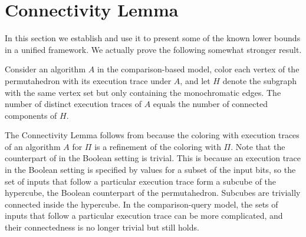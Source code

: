 \section{Connectivity Lemma}
\label{sec:connectivity}

In this section we establish  and use it to present some of the known lower bounds in a unified framework. We actually prove the following somewhat stronger result.

\begin{lemma}\label{lemma:connectivity:strong}
Consider an algorithm $A$ in the comparison-based model, color each vertex of the permutahedron with its execution trace under $A$, and let $H$ denote the subgraph with the same vertex set but only containing the monochromatic edges. The number of distinct execution traces of $A$ equals the number of connected components of $H$.
\end{lemma}
The Connectivity Lemma follows from  because the coloring with execution traces of an algorithm $A$ for $\Pi$ is a refinement of the coloring with $\Pi$. Note that the counterpart of  in the Boolean setting is trivial. This is because an execution trace in the Boolean setting is specified by values for a subset of the input bits, so the set of inputs that follow a particular execution trace form a subcube of the hypercube, the Boolean counterpart of the permutahedron. Subcubes are trivially connected inside the hypercube. In the comparison-query model, the sets of inputs that follow a particular execution trace can be more complicated, and their connectedness is no longer trivial but still holds.

